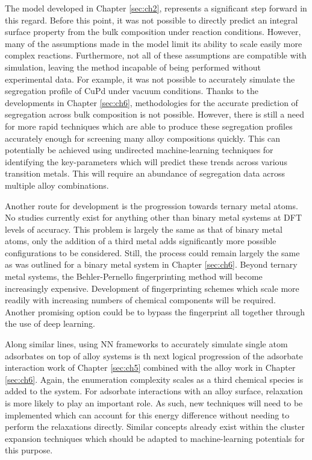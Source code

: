 \documentclass[12pt]{cmuthesis}
\begin{document}
The model developed in Chapter \ref{sec:ch2}, represents a significant step forward in this regard. Before this point, it was not possible to directly predict an integral surface property from the bulk composition under reaction conditions. However, many of the assumptions made in the model limit its ability to scale easily more complex reactions. Furthermore, not all of these assumptions are compatible with simulation, leaving the method incapable of being performed without experimental data. For example, it was not possible to accurately simulate the segregation profile of CuPd under vacuum conditions. Thanks to the developments in Chapter \ref{sec:ch6}, methodologies for the accurate prediction of segregation across bulk composition is not possible. However, there is still a need for more rapid techniques which are able to produce these segregation profiles accurately enough for screening many alloy compositions quickly. This can potentially be achieved using undirected machine-learning techniques for identifying the key-parameters which will predict these trends across various transition metals. This will require an abundance of segregation data across multiple alloy combinations.

Another route for development is the progression towards ternary metal atoms. No studies currently exist for anything other than binary metal systems at DFT levels of accuracy. This problem is largely the same as that of binary metal atoms, only the addition of a third metal adds significantly more possible configurations to be considered. Still, the process could remain largely the same as was outlined for a binary metal system in Chapter \ref{sec:ch6}. Beyond ternary metal systems, the Behler-Pernello fingerprinting method will become increasingly expensive. Development of fingerprinting schemes which scale more readily with increasing numbers of chemical components will be required. Another promising option could be to bypass the fingerprint all together through the use of deep learning.

Along similar lines, using NN frameworks to accurately simulate single atom adsorbates on top of alloy systems is th next logical progression of the adsorbate interaction work of Chapter \ref{sec:ch5} combined with the alloy work in Chapter \ref{sec:ch6}. Again, the enumeration complexity scales as a third chemical species is added to the system. For adsorbate interactions with an alloy surface, relaxation is more likely to play an important role. As such, new techniques will need to be implemented which can account for this energy difference without needing to perform the relaxations directly. Similar concepts already exist within the cluster expansion techniques which should be adapted to machine-learning potentials for this purpose.
\end{document}

